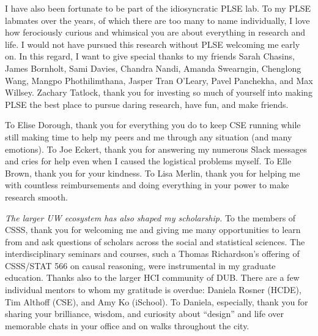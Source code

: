 I have also been fortunate to be part of the idiosyncratic PLSE
lab. 
To my PLSE labmates over the years, of which there are too many to name
individually, I love how ferociously curious and whimsical you are about
everything in research and life. I would not have pursued this
research without PLSE welcoming me early on. In this regard, I want to give
special thanks to my friends Sarah Chasins, James Bornholt, Sami Davies, Chandra
Nandi, Amanda Swearngin, Chenglong Wang, Mangpo Phothilimthana, Jasper Tran O'Leary, Pavel Panchekha,
and Max Willsey. Zachary Tatlock, thank you for investing so much of yourself
into making PLSE the best place to pursue daring research, have fun, and make
friends. 

To Elise Dorough, thank you for everything you do to keep CSE running while
still making time to help my peers and me through any situation (and many
emotions). To Joe Eckert, thank you for answering my numerous Slack messages
and cries for help even when I caused the logistical problems myself. To
Elle Brown, thank you for your kindness. To Lisa Merlin, thank you for
helping me with countless reimbursements and doing everything in your power
to make research smooth. 

\textit{The larger UW ecosystem has also shaped my scholarship.} To the members
of CSSS, thank you for welcoming me and giving me many opportunities to learn
from and ask questions of scholars across the social and statistical sciences.
The interdisciplinary seminars and courses, such a Thomas Richardson's offering
of CSSS/STAT 566 on causal reasoning, were instrumental in my graduate
education. Thanks also to the larger HCI community of DUB. There are a few
individual mentors to whom my gratitude is overdue: Daniela Rosner (HCDE), Tim
Althoff (CSE), and Amy Ko (iSchool). To Daniela, especially, thank you for
sharing your brilliance, wisdom, and curiosity about ``design'' and life over
memorable chats in your office and on walks throughout the city. 

